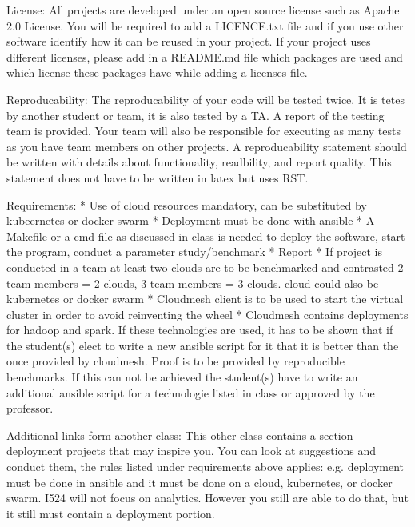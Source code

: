 License:
    All projects are developed under an open source license such
    as Apache 2.0 License. You will be required to add a LICENCE.txt
    file and if you use other software identify how it can be reused
    in your project. If your project uses different licenses, please
    add in a README.md file which packages are used and which license
    these packages have while adding a licenses file.


Reproducability:
    The reproducability of your code will be tested
    twice. It is tetes by another student or team, it is also tested
    by a TA. A report of the testing team is provided. Your team will
    also be responsible for executing as many tests as you have team
    members on other projects. A reproducability statement should be
    written with details about functionality, readbility, and report
    quality. This statement does not have to be written in latex but
    uses RST.

Requirements:
    * Use of cloud resources mandatory, can be substituted by
      kubeernetes or docker swarm
    * Deployment must be done with ansible
    * A Makefile or a cmd file as discussed in class is needed to
      deploy the software, start the program, conduct a
      parameter study/benchmark
    * Report
    * If project is conducted in a team at least two clouds are to be
      benchmarked and contrasted 2 team members = 2 clouds, 3 team
      members = 3 clouds. cloud could also be kubernetes or docker
      swarm
    * Cloudmesh client is to be used to start the virtual cluster in
      order to avoid reinventing the wheel
    * Cloudmesh contains deployments for hadoop and spark. If these
      technologies are used, it has to be shown that if the student(s)
      elect to write a new ansible script for it that it is better
      than the once provided by cloudmesh. Proof is to be provided by
      reproducible benchmarks. If this can not be achieved the
      student(s) have to write an additional ansible script for a
      technologie listed in class or approved by the professor.
      
Additional links form another class:
    This other class contains a section deployment
    projects that may inspire you. You can look at suggestions and
    conduct them, the rules
    listed under requirements above applies: e.g. deployment must be
    done in ansible and it must be done on a cloud, kubernetes, or
    docker swarm. I524 will not focus on analytics. However you still
    are able to do that, but it still must contain a deployment
    portion.
    
